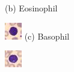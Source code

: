 \begin{figure}
\begin{minipage}{0.22\textwidth}
        (b) Eosinophil
    \end{minipage}
    \hfill
    \begin{minipage}{0.22\textwidth}
        \includegraphics[width=\linewidth]{images/bloodmnist_classes/basophil.png}
        (c) Basophil
    \end{minipage}
    \hfill
    \begin{minipage}{0.22\textwidth}
        \includegraphics[width=\linewidth]{images/bloodmnist_classes/lymphocyte.png}

\end{minipage}
\end{figure}
